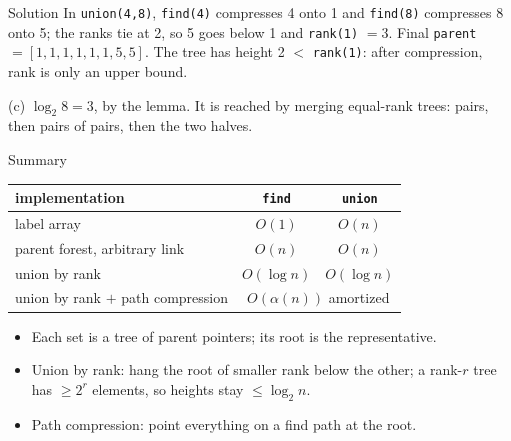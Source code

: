 \documentclass[10pt,aspectratio=169]{beamer}
\begin{document}
\begin{frame}{Solution}
  \medskip
  \small
  In \texttt{union(4,8)}, \texttt{find(4)} compresses 4 onto 1 and
  \texttt{find(8)} compresses 8 onto 5; the ranks tie at 2, so 5 goes below 1
  and \texttt{rank(1)} $= 3$. Final \texttt{parent} $= [1, 1, 1, 1, 1, 1, 5,
  5]$. The tree has height 2 $<$ \texttt{rank(1)}: after compression, rank is
  only an upper bound.

  \medskip
  (c) $\log_2 8 = 3$, by the lemma. It is reached by merging equal-rank
  trees: pairs, then pairs of pairs, then the two halves.
\end{frame}

\begin{frame}{Summary}
  \begin{center}
  \begin{tabular}{lcc}
    \toprule
    implementation & \texttt{find} & \texttt{union} \\
    \midrule
    label array & $O(1)$ & $O(n)$ \\
    parent forest, arbitrary link & $O(n)$ & $O(n)$ \\
    union by rank & $O(\log n)$ & $O(\log n)$ \\
    union by rank $+$ path compression & \multicolumn{2}{c}{$O(\alpha(n))$
      amortized} \\
    \bottomrule
  \end{tabular}
  \end{center}

  \bigskip
  \begin{itemize}
    \item Each set is a tree of parent pointers; its root is the
          representative.
    \item Union by rank: hang the root of smaller rank below the other; a
          rank-$r$ tree has $\ge 2^r$ elements, so heights stay
          $\le \log_2 n$.
    \item Path compression: point everything on a find path at the root.
  \end{itemize}
\end{frame}
\end{document}
